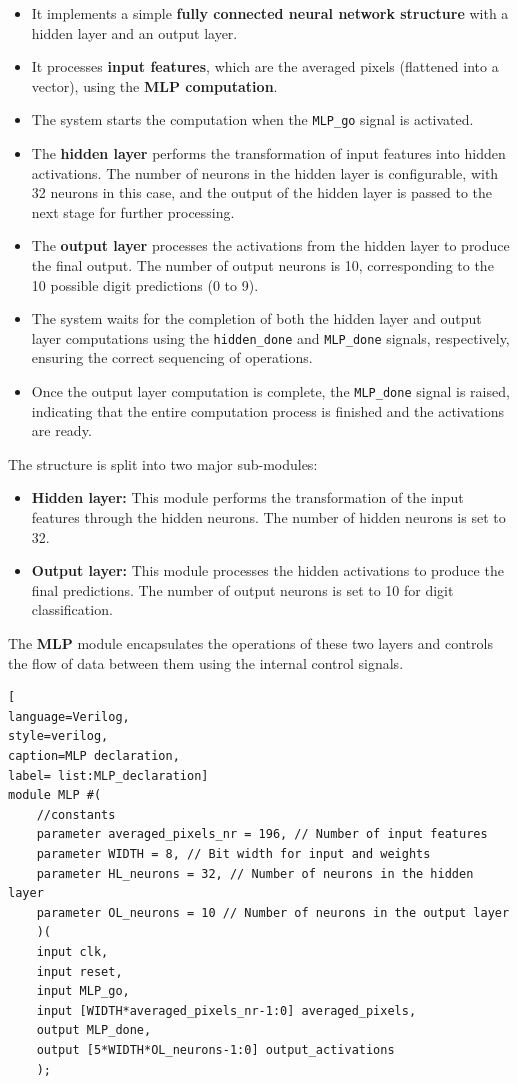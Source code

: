 \documentclass[11pt]{report}
\begin{document}
\begin{itemize}
    \item It implements a simple \textbf{fully connected neural network structure} with a hidden layer and an output layer.
    \item It processes \textbf{input features}, which are the averaged pixels (flattened into a vector), using the \textbf{MLP computation}.
    \item The system starts the computation when the \texttt{MLP\_go} signal is activated.
    \item The \textbf{hidden layer} performs the transformation of input features into hidden activations. The number of neurons in the hidden layer is configurable, with 32 neurons in this case, and the output of the hidden layer is passed to the next stage for further processing.
    \item The \textbf{output layer} processes the activations from the hidden layer to produce the final output. The number of output neurons is 10, corresponding to the 10 possible digit predictions (0 to 9).
    \item The system waits for the completion of both the hidden layer and output layer computations using the \texttt{hidden\_done} and \texttt{MLP\_done} signals, respectively, ensuring the correct sequencing of operations.
    \item Once the output layer computation is complete, the \texttt{MLP\_done} signal is raised, indicating that the entire computation process is finished and the activations are ready.
\end{itemize}

The structure is split into two major sub-modules:

\begin{itemize}
    \item \textbf{Hidden layer:} This module performs the transformation of the input features through the hidden neurons. The number of hidden neurons is set to 32.
    \item \textbf{Output layer:} This module processes the hidden activations to produce the final predictions. The number of output neurons is set to 10 for digit classification.
\end{itemize}

The \textbf{MLP} module encapsulates the operations of these two layers and controls the flow of data between them using the internal control signals.

\begin{lstlisting}[
language=Verilog,
style=verilog,
caption=MLP declaration,
label= list:MLP_declaration]
module MLP #(
    //constants
    parameter averaged_pixels_nr = 196, // Number of input features
    parameter WIDTH = 8, // Bit width for input and weights
    parameter HL_neurons = 32, // Number of neurons in the hidden layer
    parameter OL_neurons = 10 // Number of neurons in the output layer
    )(
    input clk,
    input reset,
    input MLP_go,
    input [WIDTH*averaged_pixels_nr-1:0] averaged_pixels,
    output MLP_done,
    output [5*WIDTH*OL_neurons-1:0] output_activations
    );
\end{lstlisting}
\end{document}
